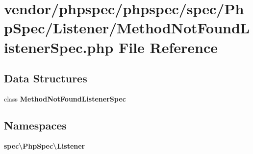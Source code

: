 \section{vendor/phpspec/phpspec/spec/\+Php\+Spec/\+Listener/\+Method\+Not\+Found\+Listener\+Spec.php File Reference}
\label{_method_not_found_listener_spec_8php}
\subsection*{Data Structures}
\begin{DoxyCompactItemize}
\item 
class {\bf Method\+Not\+Found\+Listener\+Spec}
\end{DoxyCompactItemize}
\subsection*{Namespaces}
\begin{DoxyCompactItemize}
\item 
 {\bf spec\textbackslash{}\+Php\+Spec\textbackslash{}\+Listener}
\end{DoxyCompactItemize}
